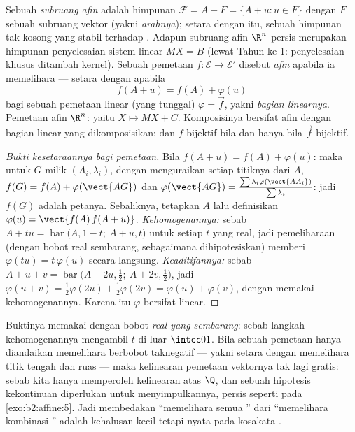 \begin{definition}\label{def:b2:affine:subspace}
Sebuah \emph{subruang afin} adalah himpunan $\mathcal{F} = A + F = \{A + u :
u \in F\}$ dengan $F$ sebuah subruang vektor (yakni \emph{arahnya});
setara dengan itu, sebuah himpunan tak kosong yang stabil terhadap . Adapun subruang
afin $\R^n$ persis merupakan himpunan penyelesaian sistem linear
$MX = B$ (lewat Tahun ke-1: penyelesaian khusus ditambah kernel). Sebuah pemetaan $f \colon
\mathcal{E} \to \mathcal{E}'$ disebut \emph{afin}
apabila ia memelihara  --- setara dengan apabila
\[
f(A + u) = f(A) + \varphi(u)
\]
bagi sebuah pemetaan linear (yang tunggal) $\varphi = \vec f$, yakni \emph{bagian
linearnya}. Pemetaan afin $\R^n$: yaitu $X \mapsto MX + C$. Komposisinya bersifat
afin dengan bagian linear yang dikomposisikan; dan $f$ bijektif bila dan hanya bila $\vec f$
bijektif.
\end{definition}

\begin{proof}[Bukti kesetaraannya bagi pemetaan]
Bila $f(A + u) = f(A) + \varphi(u)$: maka untuk  $G$ milik $(A_i,
\lambda_i)$, dengan menguraikan setiap titiknya dari $A$, $f(G) = f(A) +
\varphi(\vect{AG})$ dan $\varphi(\vect{AG}) =
\frac{\sum\lambda_i\varphi(\vect{AA_i})}{\sum\lambda_i}$: jadi $f(G)$ adalah
 petanya. Sebaliknya, tetapkan $A$ lalu definisikan
$\varphi(u) = \vect{f(A)\,f(A + u)}$. \emph{Kehomogenannya:} sebab $A + tu =
\operatorname{bar}\bigl(A, 1-t;\ A + u, t\bigr)$ untuk setiap $t$ yang
real, jadi pemeliharaan  (dengan bobot real sembarang,
sebagaimana dihipotesiskan) memberi $\varphi(tu) = t\,\varphi(u)$ secara langsung.
\emph{Keaditifannya:} sebab $A + u + v = \operatorname{bar}\bigl(A + 2u,
\tfrac12;\ A + 2v, \tfrac12\bigr)$, jadi $\varphi(u + v) =
\tfrac12\varphi(2u) + \tfrac12\varphi(2v) = \varphi(u) +
\varphi(v)$, dengan memakai kehomogenannya. Karena itu $\varphi$ bersifat linear.
\end{proof}

\begin{remark}
Buktinya memakai  dengan bobot \emph{real yang
sembarang}: sebab langkah kehomogenannya mengambil $t$ di luar $\intcc01$.
Bila sebuah pemetaan hanya diandaikan memelihara  berbobot
taknegatif --- yakni setara dengan memelihara titik tengah dan ruas
--- maka kelinearan pemetaan vektornya tak lagi gratis:
sebab kita hanya memperoleh kelinearan atas $\Q$, dan sebuah hipotesis kekontinuan
diperlukan untuk menyimpulkannya, persis seperti pada
\cref{exo:b2:affine:5}. Jadi membedakan ``memelihara semua
'' dari ``memelihara kombinasi '' adalah
kehalusan kecil tetapi nyata pada kosakata .
\end{remark}

